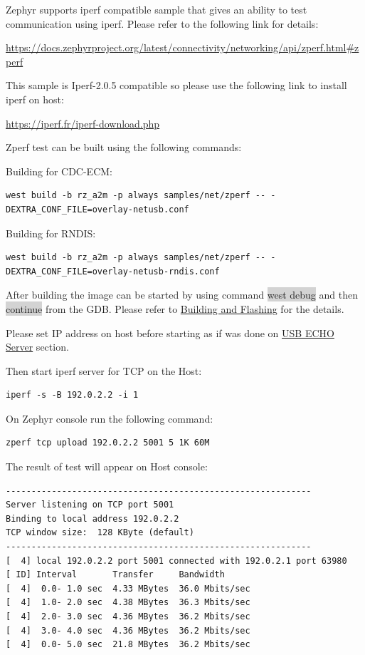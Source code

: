 \documentclass[11pt,a4paper,oneside]{article}
\begin{document}
Zephyr supports iperf compatible sample that gives an ability to test communication using iperf.
Please refer to the following link for details:

\url{https://docs.zephyrproject.org/latest/connectivity/networking/api/zperf.html#zperf}

This sample is Iperf-2.0.5 compatible so please use the following link to install iperf on host:

\url{https://iperf.fr/iperf-download.php}

Zperf test can be built using the following commands:

Building for CDC-ECM:
\begin{lstlisting}
west build -b rz_a2m -p always samples/net/zperf -- -DEXTRA_CONF_FILE=overlay-netusb.conf
\end{lstlisting}
Building for RNDIS:
\begin{lstlisting}
west build -b rz_a2m -p always samples/net/zperf -- -DEXTRA_CONF_FILE=overlay-netusb-rndis.conf
\end{lstlisting}

After building the image can be started by using command \colorbox{lightgray}{west debug}
and then \colorbox{lightgray}{continue} from the GDB. Please refer to
\hyperref[building-and-flashing]{Building and Flashing} for the
details.

Please set IP address on host before starting as if was done on \hyperref[usb-echo-server]{USB ECHO Server} section.

Then start iperf server for TCP on the Host:
\begin{lstlisting}
iperf -s -B 192.0.2.2 -i 1
\end{lstlisting}

On Zephyr console run the following command:
\begin{lstlisting}
zperf tcp upload 192.0.2.2 5001 5 1K 60M
\end{lstlisting}

The result of test will appear on Host console:
\begin{lstlisting}
------------------------------------------------------------
Server listening on TCP port 5001
Binding to local address 192.0.2.2
TCP window size:  128 KByte (default)
------------------------------------------------------------
[  4] local 192.0.2.2 port 5001 connected with 192.0.2.1 port 63980
[ ID] Interval       Transfer     Bandwidth
[  4]  0.0- 1.0 sec  4.33 MBytes  36.0 Mbits/sec
[  4]  1.0- 2.0 sec  4.38 MBytes  36.3 Mbits/sec
[  4]  2.0- 3.0 sec  4.36 MBytes  36.2 Mbits/sec
[  4]  3.0- 4.0 sec  4.36 MBytes  36.2 Mbits/sec
[  4]  0.0- 5.0 sec  21.8 MBytes  36.2 Mbits/sec
\end{lstlisting}
\end{document}
